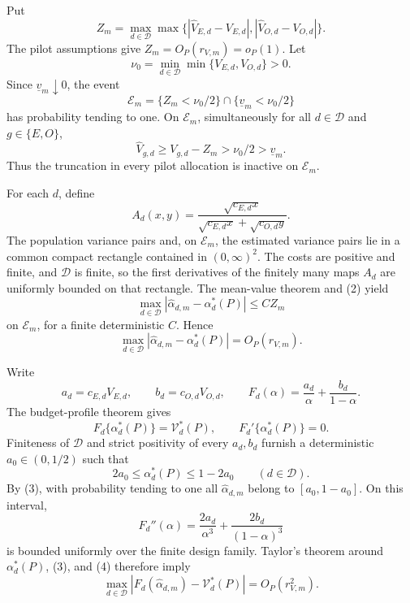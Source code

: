 Put
\[
 Z_m=\max_{d\in\mathcal D}\max\bigl\{
 |\widehat V_{E,d}-V_{E,d}|,
 |\widehat V_{O,d}-V_{O,d}|\bigr\}.
\]
The pilot assumptions give \(Z_m=O_P(r_{V,m})=o_P(1)\).  Let
\[
 \nu_0=\min_{d\in\mathcal D}\min\{V_{E,d},V_{O,d}\}>0.
\]
Since \(\underline v_m\downarrow0\), the event
\[
 \mathcal E_m=\{Z_m<\nu_0/2\}\cap\{\underline v_m<\nu_0/2\}
 \tag{1}
\]
has probability tending to one.  On \(\mathcal E_m\), simultaneously for all \(d\in\mathcal D\) and \(g\in\{E,O\}\),
\[
 \widehat V_{g,d}\ge V_{g,d}-Z_m>\nu_0/2>\underline v_m.
 \tag{2}
\]
Thus the truncation in every pilot allocation is inactive on \(\mathcal E_m\).

For each \(d\), define
\[
 A_d(x,y)=
 \frac{\sqrt{c_{E,d}x}}
 {\sqrt{c_{E,d}x}+\sqrt{c_{O,d}y}}.
\]
The population variance pairs and, on \(\mathcal E_m\), the estimated variance pairs lie in a common compact rectangle contained in \((0,\infty)^2\).  The costs are positive and finite, and \(\mathcal D\) is finite, so the first derivatives of the finitely many maps \(A_d\) are uniformly bounded on that rectangle.  The mean-value theorem and (2) yield
\[
 \max_{d\in\mathcal D}
 |\widehat\alpha_{d,m}-\alpha_d^*(P)|
 \le C Z_m
\]
on \(\mathcal E_m\), for a finite deterministic \(C\).  Hence
\[
 \max_{d\in\mathcal D}
 |\widehat\alpha_{d,m}-\alpha_d^*(P)|
 =O_P(r_{V,m}).
 \tag{3}
\]

Write
\[
 a_d=c_{E,d}V_{E,d},\qquad b_d=c_{O,d}V_{O,d},\qquad
 F_d(\alpha)=\frac{a_d}{\alpha}+\frac{b_d}{1-\alpha}.
\]
The budget-profile theorem gives
\[
 F_d\{\alpha_d^*(P)\}=\mathcal V_d^*(P),
 \qquad F_d'\{\alpha_d^*(P)\}=0.
 \tag{4}
\]
Finiteness of \(\mathcal D\) and strict positivity of every \(a_d,b_d\) furnish a deterministic \(a_0\in(0,1/2)\) such that
\[
 2a_0\le\alpha_d^*(P)\le1-2a_0
 \qquad(d\in\mathcal D).
\]
By (3), with probability tending to one all \(\widehat\alpha_{d,m}\) belong to \([a_0,1-a_0]\).  On this interval,
\[
 F_d''(\alpha)=\frac{2a_d}{\alpha^3}
 +\frac{2b_d}{(1-\alpha)^3}
\]
is bounded uniformly over the finite design family.  Taylor's theorem around \(\alpha_d^*(P)\), (3), and (4) therefore imply
\[
 \max_{d\in\mathcal D}
 \left|F_d(\widehat\alpha_{d,m})-\mathcal V_d^*(P)\right|
 =O_P(r_{V,m}^2).
 \tag{5}
\]


